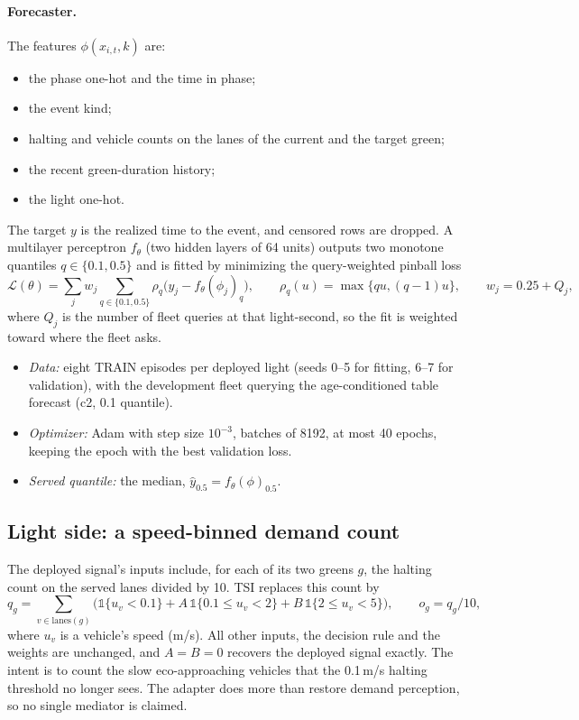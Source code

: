 \documentclass[11pt]{article}
\begin{document}
\paragraph{Forecaster.} The features $\phi(x_{i,t},k)$ are:
\begin{itemize}\setlength\itemsep{0pt}
\item the phase one-hot and the time in phase;
\item the event kind;
\item halting and vehicle counts on the lanes of the current and the target green;
\item the recent green-duration history;
\item the light one-hot.
\end{itemize}
The target $y$ is the realized time to the event, and censored rows are dropped. A multilayer perceptron $f_\theta$ (two hidden layers of
64 units) outputs two monotone quantiles $q\in\{0.1,0.5\}$ and is fitted by minimizing the query-weighted pinball loss
\begin{equation}
\mathcal L(\theta)=\sum_j w_j\sum_{q\in\{0.1,0.5\}}\rho_q\big(y_j-f_\theta(\phi_j)_q\big),\qquad \rho_q(u)=\max\{qu,(q-1)u\},\qquad w_j=0.25+Q_j,
\end{equation}
where $Q_j$ is the number of fleet queries at that light-second, so the fit is weighted toward where the fleet asks.
\begin{itemize}\setlength\itemsep{0pt}
\item \emph{Data:} eight TRAIN episodes per deployed light (seeds 0--5 for fitting, 6--7 for validation), with the development fleet
querying the age-conditioned table forecast (c2, 0.1 quantile).
\item \emph{Optimizer:} Adam with step size $10^{-3}$, batches of 8192, at most 40 epochs, keeping the epoch with the best validation loss.
\item \emph{Served quantile:} the median, $\hat y_{0.5}=f_\theta(\phi)_{0.5}$.
\end{itemize}
\subsection{Light side: a speed-binned demand count}
The deployed signal's inputs include, for each of its two greens $g$, the halting count on the served lanes divided by 10. TSI replaces this
count by
\begin{equation}
q_g=\sum_{v\in\mathrm{lanes}(g)}\Big(\mathbb 1\{u_v<0.1\}+A\,\mathbb 1\{0.1\le u_v<2\}+B\,\mathbb 1\{2\le u_v<5\}\Big),\qquad o_g=q_g/10,
\end{equation}
where $u_v$ is a vehicle's speed (m/s). All other inputs, the decision rule and the weights are unchanged, and $A=B=0$ recovers the deployed
signal exactly. The intent is to count the slow eco-approaching vehicles that the 0.1\,m/s halting threshold no longer sees. The adapter
does more than restore demand perception, so no single mediator is claimed.
\end{document}
